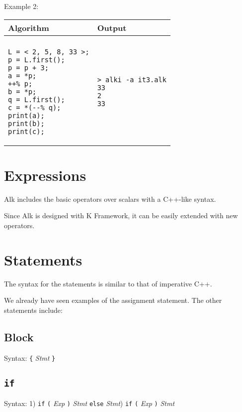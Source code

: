 \documentclass[a4paper]{report}
\begin{document}
Example 2:
\begin{center}
\begin{tabular}{ll}
Algorithm & Output\\
\hline
\\
\begin{minipage}{.45\textwidth}
\begin{verbatim}
L = < 2, 5, 8, 33 >;
p = L.first();
p = p + 3;
a = *p;
++% p;
b = *p;
q = L.first();
c = *(--% q);
print(a);
print(b);
print(c);
\end{verbatim}
\end{minipage}
&
\begin{minipage}{.45\textwidth}
\begin{verbatim}
> alki -a it3.alk
33
2
33
\end{verbatim}
\end{minipage}
\end{tabular}
\end{center}

\section{Expressions}

Alk includes the basic operators over scalars with a C++-like syntax.

Since Alk is designed with K Framework, it can be easily extended with new operators.

\section{Statements}

The syntax for the statements is similar to that of imperative C++.

We already have seen examples of the assignment statement.
The other statements include:

\subsection{Block}

Syntax: \verb'{' {\it Stmt} \verb'}'

\subsection{\texttt{if}}


Syntax: 1) \verb"if" \verb"(" {\it Exp} \verb")" {\it Stmt} \verb"else" {\it Stmt}) \verb"if" \verb"(" {\it Exp} \verb")" {\it Stmt}
\end{document}
